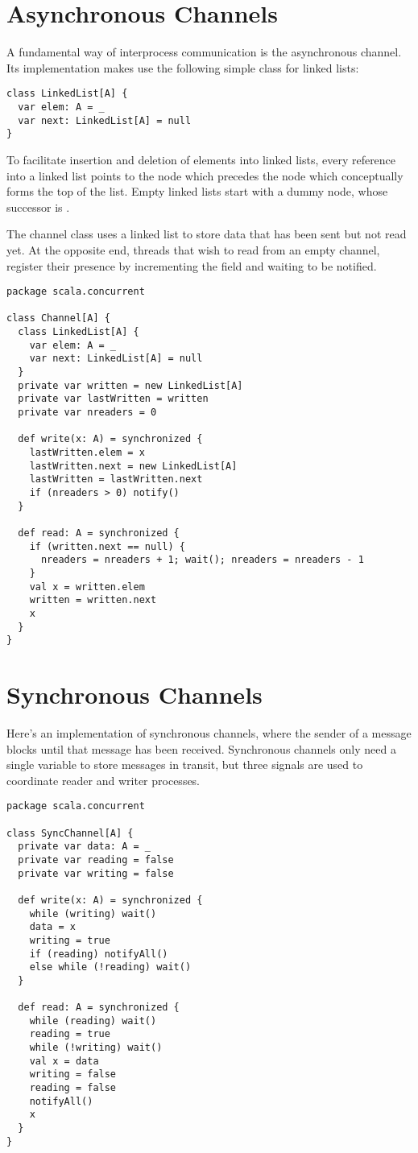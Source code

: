 \section{Asynchronous Channels}

A fundamental way of interprocess communication is the asynchronous
channel. Its implementation makes use the following simple class for linked
lists:
\begin{lstlisting}
class LinkedList[A] {
  var elem: A = _
  var next: LinkedList[A] = null
}
\end{lstlisting}
To facilitate insertion and deletion of elements into linked lists,
every reference into a linked list points to the node which precedes
the node which conceptually forms the top of the list.
Empty linked lists start with a dummy node, whose successor is .

The channel class uses a linked list to store data that has been sent
but not read yet. At the opposite end, threads that
wish to read from an empty channel, register their presence by
incrementing the  field and waiting to be notified.
\begin{lstlisting}
package scala.concurrent

class Channel[A] {
  class LinkedList[A] {
    var elem: A = _
    var next: LinkedList[A] = null
  }
  private var written = new LinkedList[A]
  private var lastWritten = written
  private var nreaders = 0

  def write(x: A) = synchronized {
    lastWritten.elem = x
    lastWritten.next = new LinkedList[A]
    lastWritten = lastWritten.next
    if (nreaders > 0) notify()
  }

  def read: A = synchronized {
    if (written.next == null) {
      nreaders = nreaders + 1; wait(); nreaders = nreaders - 1
    }
    val x = written.elem
    written = written.next
    x
  }
}
\end{lstlisting}

\section{Synchronous Channels}

Here's an implementation of synchronous channels, where the sender of
a message blocks until that message has been received. Synchronous
channels only need a single variable to store messages in transit, but
three signals are used to coordinate reader and writer processes.
\begin{lstlisting}
package scala.concurrent

class SyncChannel[A] {
  private var data: A = _
  private var reading = false
  private var writing = false

  def write(x: A) = synchronized {
    while (writing) wait()
    data = x
    writing = true
    if (reading) notifyAll()
    else while (!reading) wait()
  }

  def read: A = synchronized {
    while (reading) wait()
    reading = true
    while (!writing) wait()
    val x = data
    writing = false
    reading = false
    notifyAll()
    x
  }
}
\end{lstlisting}

